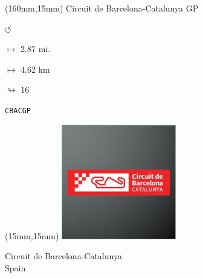 \begin{textblock*}{40mm}(160mm,15mm)%
Circuit de Barcelona-Catalunya GP
\par \Huge$\circlearrowleft$
\Large
\par$\mapsto$ 2.87 mi.
\par$\mapsto$ 4.62 km
\par$\looparrowright$ 16
\par\hfill\tiny\tt CBACGP\\
\end{textblock*}
\null\newpage

\begin{textblock*}{50mm}(15mm,15mm)%
\includegraphics[width=50mm]{LG/2015-05-20_00078.png}
\par Circuit de Barcelona-Catalunya\\ Spain
\end{textblock*}
